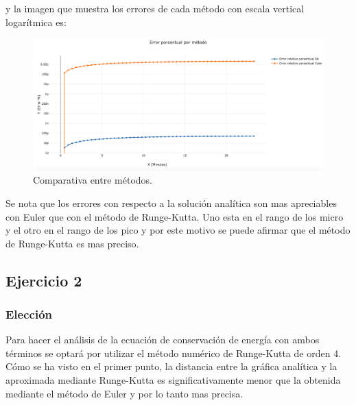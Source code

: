 \documentclass[10pt,a4paper]{article}
\begin{document}
y la imagen que muestra los errores de cada método con escala vertical logarítmica es:
\begin{figure}[H]
\centering
\includegraphics[width=15cm]{Errores-ej1.png}
\caption{Comparativa entre métodos.}
\end{figure}

Se nota que los errores con respecto a la solución analítica son mas apreciables con Euler que con el método de Runge-Kutta. Uno esta en el rango de los micro y el otro en el rango de los pico y por este motivo se puede afirmar que el método de Runge-Kutta es mas preciso.



\subsection{Ejercicio 2}
\subsubsection{Elección}
Para hacer el análisis de la ecuación de conservación de energía con ambos términos se optará por utilizar el método numérico de Runge-Kutta de orden 4.  Cómo se ha visto en el primer punto, la distancia entre la gráfica analítica y la aproximada mediante Runge-Kutta es significativamente menor que la obtenida mediante el método de Euler y por lo tanto mas precisa.\\
\end{document}
